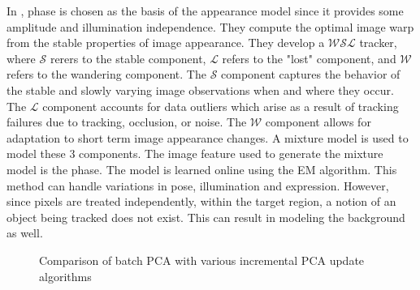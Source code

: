 \begin{Body}
In \cite{2003_JNL_TRKsubspace_Jepson}, phase is chosen as the basis of the appearance model since it provides some amplitude and illumination independence.  They compute the optimal image warp from the stable properties of image appearance.  They develop a $\mathcal{WSL}$ tracker, where $\mathcal{S}$ rerers to the stable component, $\mathcal{L}$ refers to the "lost" component, and $\mathcal{W}$ refers to the wandering component.  The $\mathcal{S}$ component captures the behavior of the stable and slowly varying image observations when and where they occur.  The $\mathcal{L}$ component accounts for data outliers which arise as a result of tracking failures due to tracking, occlusion, or noise.  The $\mathcal{W}$ component allows for adaptation to short term image appearance changes.  A mixture model is used to model these 3 components.  The image feature used to generate the mixture model is the phase.  The model is learned online using the EM algorithm.  This method can handle variations in pose, illumination and expression.  However, since pixels are treated independently, within the target region, a notion of an object being tracked does not exist.  This can result in modeling the background as well. 

								\begin{figure}[t]
								\centering	
								\caption{Comparison of batch PCA with various incremental PCA update algorithms \cite{2008_JNL_TRKsubs_Skocaj}}
								\label{fig:2008_JNL_TRKsub_Skocaj}				
								\end{figure}


\end{Body}
